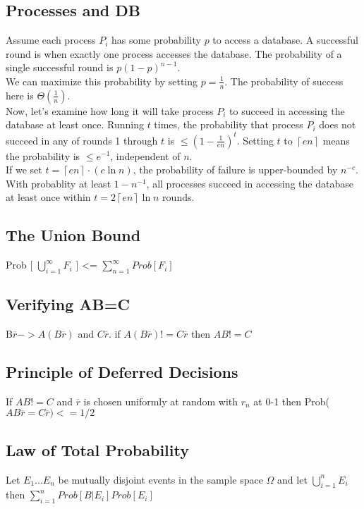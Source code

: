 \subsection{Processes and DB}
Assume each process $P_i$ has some probability $p$ to access a database. A successful round is when exactly one process accesses the database. The probability of a single successful round is $p(1 - p)^{n-1}$.\\
We can maximize this probability by setting $p = \frac{1}{n}$. The probability of success here is $\Theta(\frac{1}{n})$.\\
Now, let's examine how long it will take process $P_i$ to succeed in accessing the database at least once. Running $t$ times, the probability that process $P_i$ does not succeed in any of rounds 1 through $t$ is $\leq (1 - \frac{1}{en})^t$. Setting $t$ to $\left\lceil en \right\rceil$ means the probability is $\leq e^{-1}$, independent of $n$.\\
If we set $t = \left\lceil en \right\rceil \cdot (c \ln n)$, the probability of failure is upper-bounded by $n^{-c}$.\\
With probablity at least $1 - n^{-1}$, all processes succeed in accessing the database at least once within $t = 2 \left\lceil en \right\rceil \ln n$ rounds.

\subsection{The Union Bound}
Prob [ $\bigcup\limits_{i=1}^{\infty} F_{i}$ ] <= $\sum_{n=1}^{\infty}  Prob[ F_{i}] $ 


\subsection{Verifying AB=C}

B$\overbar{r} -> A(B\overbar{r})$ and $C\overbar{r}$. if $A(B\overbar{r}) != C\overbar{r}$ then $AB != C$

\subsection{Principle of Deferred Decisions}
If $AB != C$ and $\overbar{r}$ is chosen uniformly at random with $r_n$ at 0-1 then Prob($AB\overbar{r} = C\overbar{r}) <= 1/2$

\subsection{Law of Total Probability}
Let $E_1 ... E_n$ be mutually disjoint events in the sample space $\Omega$ and let $\bigcup\limits_{i=1}^{n} E_{i}$ then $\sum_{i=1}^{n}  Prob[ B | E_{i}] Prob[E_{i}] $ 

